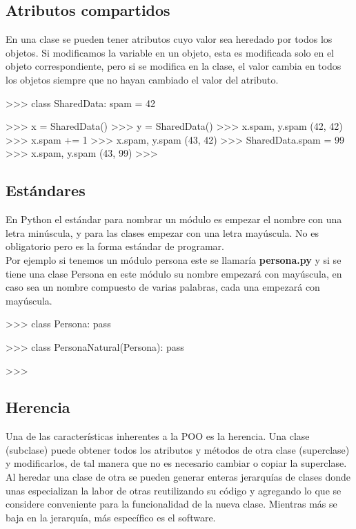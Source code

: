 \subsection{Atributos compartidos}

En una clase se pueden tener atributos cuyo valor sea heredado por todos los objetos. Si modificamos la variable en un objeto, esta es modificada solo en el objeto correspondiente, pero si se modifica en la clase, el valor cambia en todos los objetos siempre que no hayan cambiado el valor del atributo.\\

\begin{pyglist} [language=python]
>>> class SharedData:
         spam = 42
    
>>> x = SharedData()
>>> y = SharedData()
>>> x.spam, y.spam
(42, 42)
>>> x.spam += 1
>>> x.spam, y.spam
(43, 42)
>>> SharedData.spam = 99
>>> x.spam, y.spam
(43, 99)
>>> 
\end{pyglist}


\subsection{Estándares}

En Python el estándar para nombrar un módulo es empezar el nombre con una letra minúscula, y para las clases empezar con una letra mayúscula. No es obligatorio pero es la forma estándar de programar.\\

Por ejemplo si tenemos un módulo persona este se llamaría \textbf{persona.py} y si se tiene una clase Persona en este módulo su nombre empezará con mayúscula, en caso sea un nombre compuesto de varias palabras, cada una empezará con mayúscula.\\

\begin{pyglist} [language=python]
>>> class Persona:
         pass
    
>>> class PersonaNatural(Persona):
         pass
    
>>> 
\end{pyglist}



\subsection{Herencia}

Una de las características inherentes a la POO es la herencia. Una clase (subclase) puede obtener todos los atributos y métodos de otra clase (superclase) y modificarlos, de tal manera que no es necesario cambiar o copiar la superclase. Al heredar una clase de otra se pueden generar enteras jerarquías de clases donde unas especializan la labor de otras reutilizando su código y agregando lo que se considere conveniente para la funcionalidad de la nueva clase. Mientras más se baja en la jerarquía, más específico es el software.\\

